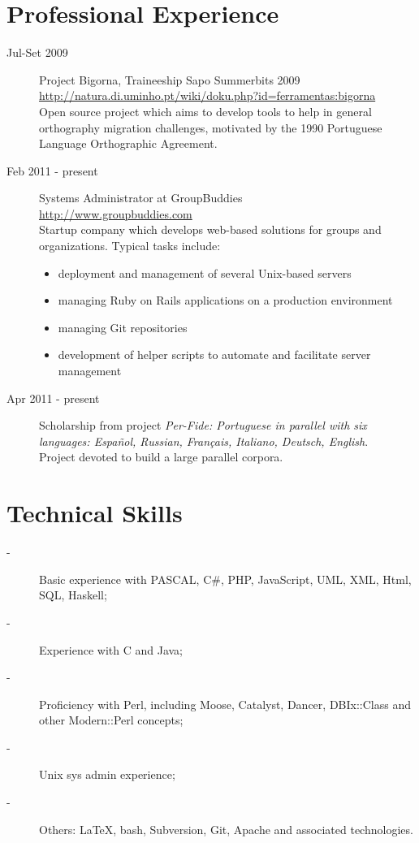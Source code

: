 \documentclass{article}
\begin{document}
\section{Professional Experience}
\begin{description}
\item [Jul-Set 2009] Project Bigorna, Traineeship Sapo Summerbits 2009\\
\url{http://natura.di.uminho.pt/wiki/doku.php?id=ferramentas:bigorna}\\
Open source project which aims to develop tools to help in general orthography migration challenges, motivated by the 1990 Portuguese Language Orthographic Agreement.
\item [Feb 2011 - present] Systems Administrator at GroupBuddies\\
\url{http://www.groupbuddies.com}\\
Startup company which develops web-based solutions for groups and organizations. Typical tasks include:
\begin{itemize}
	\item deployment and management of several Unix-based servers
	\item managing Ruby on Rails applications on a production environment
	\item managing Git repositories
	\item development of helper scripts to automate and facilitate server management
	\end{itemize}
\item [Apr 2011 - present] Scholarship from project \textit{Per-Fide: Portuguese in parallel with six languages: Español, Russian, Français, Italiano, Deutsch, English}.\\
Project devoted to build a large parallel corpora.

\end{description}

\section{Technical Skills}
\begin{description}
\item[-] Basic experience with PASCAL, C\#, PHP, JavaScript, UML, XML, Html, SQL, Haskell;
\item[-] Experience with C and Java;
\item[-] Proficiency with  Perl, including Moose, Catalyst, Dancer, DBIx::Class and other Modern::Perl concepts;
\item[-] Unix sys admin experience;
\item[-] Others: \LaTeX, bash, Subversion, Git, Apache and associated technologies.
\end{description}
\end{document}
